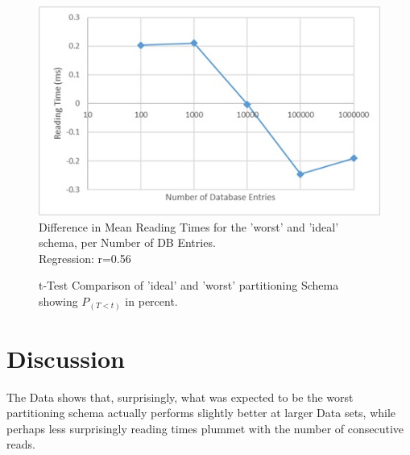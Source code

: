 \documentclass{template/csfourzero}
\begin{document}
  \begin{figure}[H]
      \centering
      \includegraphics{figures/worstIdealTimes.jpg}
      \caption{Difference in Mean Reading Times for the 'worst' and 'ideal' schema, per Number of DB Entries.
      \\
      Regression: r=0.56}
      \label{fig:worstIdeal}
  \end{figure}
  
  \begin{figure}[H]
      \centering
      \noindent{}
      \caption{t-Test Comparison of 'ideal' and 'worst' partitioning Schema showing \(P_{(T<t)}\) in percent.}
      \label{fig:tTest}
  \end{figure}
  
\section{Discussion} %
\label{sec:discuss}

  The Data shows that, surprisingly, what was expected to be the worst partitioning schema actually performs slightly better at larger Data sets, while perhaps less surprisingly reading times plummet with the number of consecutive reads. 
  
\end{document}
